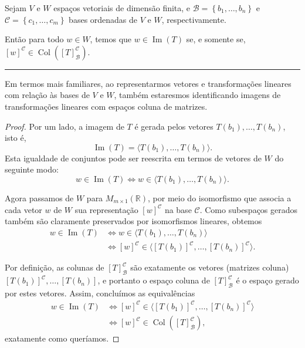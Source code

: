 \begin{theorem}
	Sejam $V$ e $W$ espaços vetoriais de dimensão finita, e $\mathcal{B}=\left\{b_1,\ldots,b_n\right\}$ e $\mathcal{C}=\left\{c_1,\ldots,c_m\right\}$ bases ordenadas de $V$ e $W$, respectivamente.
	
	Então para todo $w\in W$, temos que $w\in\operatorname{Im}(T)$ se, e somente se, $[w]^{\mathcal{C}}\in\operatorname{Col}\left(\left[T\right]_{\mathcal{B}}^\mathcal{C}\right)$.
	
	\hrule
	
	Em termos mais familiares, ao representarmos vetores e transformações lineares com relação às bases de $V$ e $W$, também estaresmos identificando imagens de transformações lineares com espaços coluna de matrizes.
\end{theorem}

\begin{proof}
	Por um lado, a imagem de $T$ é gerada pelos vetores $T(b_1),\ldots,T(b_n)$, isto é,
	\[\operatorname{Im}(T)=\langle T(b_1),\ldots,T(b_n)\rangle.\]
	Esta igualdade de conjuntos pode ser reescrita em termos de vetores de $W$ do seguinte modo:
	\[w\in\operatorname{Im}(T)\iff w\in\langle T(b_1),\ldots,T(b_n)\rangle.\]
	
	Agora passamos de $W$ para $M_{m\times 1}(\mathbb{R})$, por meio do isomorfismo que associa a cada vetor $w$ de $W$ sua representação $\left[w\right]^{\mathcal{C}}$ na base $\mathcal{C}$. Como subespaços gerados também são claramente preservados por isomorfismos lineares, obtemos
	\begin{align*}
	w\in\operatorname{Im}(T)
		&\iff w\in\langle T(b_1),\ldots,T(b_n)\rangle\\
		&\iff \left[w\right]^{\mathcal{C}}\in\langle\left[T(b_1)\right]^{\mathcal{C}},\ldots,\left[T(b_n)\right]^{\mathcal{C}}\rangle.
	\end{align*}
	
	Por definição, as colunas de $\left[T\right]_{\mathcal{B}}^{\mathcal{C}}$ são exatamente os vetores (matrizes coluna) $\left[T(b_1)\right]^{\mathcal{C}},\ldots,\left[T(b_n)\right]$, e portanto o espaço coluna de $\left[T\right]_{\mathcal{B}}^{\mathcal{C}}$ é o espaço gerado por estes vetores. Assim, concluímos as equivalências
	\begin{align*}
	w\in\operatorname{Im}(T)
		&\iff \left[w\right]^{\mathcal{C}}\in\langle\left[T(b_1)\right]^{\mathcal{C}},\ldots,\left[T(b_n)\right]^{\mathcal{C}}\rangle\\
		&\iff \left[w\right]^{\mathcal{C}}\in\operatorname{Col}\left(\left[T\right]_{\mathcal{B}}^{\mathcal{C}}\right),
	\end{align*}
	exatamente como queríamos.
\end{proof}
